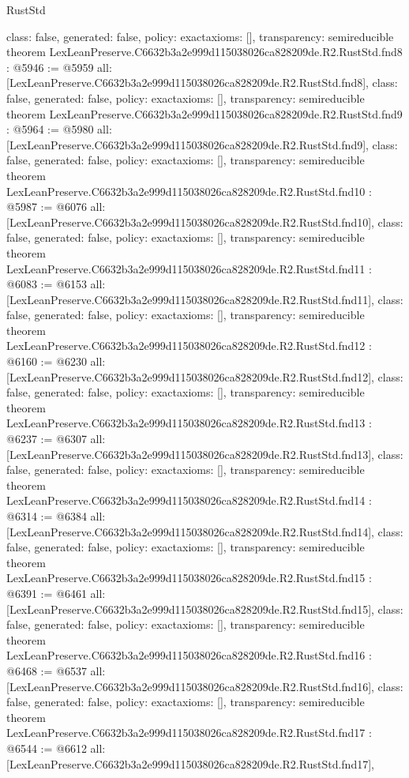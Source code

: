 \begin{lexlean}{RustStd}
\begin{coremodule}
{  class: false,
  generated: false,
  policy: exact{axioms: []},
  transparency: semireducible
}
theorem LexLeanPreserve.C6632b3a2e999d115038026ca828209de.R2.RustStd.fnd8 : @5946 := @5959 {
  all: [LexLeanPreserve.C6632b3a2e999d115038026ca828209de.R2.RustStd.fnd8],
  class: false,
  generated: false,
  policy: exact{axioms: []},
  transparency: semireducible
}
theorem LexLeanPreserve.C6632b3a2e999d115038026ca828209de.R2.RustStd.fnd9 : @5964 := @5980 {
  all: [LexLeanPreserve.C6632b3a2e999d115038026ca828209de.R2.RustStd.fnd9],
  class: false,
  generated: false,
  policy: exact{axioms: []},
  transparency: semireducible
}
theorem LexLeanPreserve.C6632b3a2e999d115038026ca828209de.R2.RustStd.fnd10 : @5987 := @6076 {
  all: [LexLeanPreserve.C6632b3a2e999d115038026ca828209de.R2.RustStd.fnd10],
  class: false,
  generated: false,
  policy: exact{axioms: []},
  transparency: semireducible
}
theorem LexLeanPreserve.C6632b3a2e999d115038026ca828209de.R2.RustStd.fnd11 : @6083 := @6153 {
  all: [LexLeanPreserve.C6632b3a2e999d115038026ca828209de.R2.RustStd.fnd11],
  class: false,
  generated: false,
  policy: exact{axioms: []},
  transparency: semireducible
}
theorem LexLeanPreserve.C6632b3a2e999d115038026ca828209de.R2.RustStd.fnd12 : @6160 := @6230 {
  all: [LexLeanPreserve.C6632b3a2e999d115038026ca828209de.R2.RustStd.fnd12],
  class: false,
  generated: false,
  policy: exact{axioms: []},
  transparency: semireducible
}
theorem LexLeanPreserve.C6632b3a2e999d115038026ca828209de.R2.RustStd.fnd13 : @6237 := @6307 {
  all: [LexLeanPreserve.C6632b3a2e999d115038026ca828209de.R2.RustStd.fnd13],
  class: false,
  generated: false,
  policy: exact{axioms: []},
  transparency: semireducible
}
theorem LexLeanPreserve.C6632b3a2e999d115038026ca828209de.R2.RustStd.fnd14 : @6314 := @6384 {
  all: [LexLeanPreserve.C6632b3a2e999d115038026ca828209de.R2.RustStd.fnd14],
  class: false,
  generated: false,
  policy: exact{axioms: []},
  transparency: semireducible
}
theorem LexLeanPreserve.C6632b3a2e999d115038026ca828209de.R2.RustStd.fnd15 : @6391 := @6461 {
  all: [LexLeanPreserve.C6632b3a2e999d115038026ca828209de.R2.RustStd.fnd15],
  class: false,
  generated: false,
  policy: exact{axioms: []},
  transparency: semireducible
}
theorem LexLeanPreserve.C6632b3a2e999d115038026ca828209de.R2.RustStd.fnd16 : @6468 := @6537 {
  all: [LexLeanPreserve.C6632b3a2e999d115038026ca828209de.R2.RustStd.fnd16],
  class: false,
  generated: false,
  policy: exact{axioms: []},
  transparency: semireducible
}
theorem LexLeanPreserve.C6632b3a2e999d115038026ca828209de.R2.RustStd.fnd17 : @6544 := @6612 {
  all: [LexLeanPreserve.C6632b3a2e999d115038026ca828209de.R2.RustStd.fnd17],
}
\end{coremodule}
\end{lexlean}
